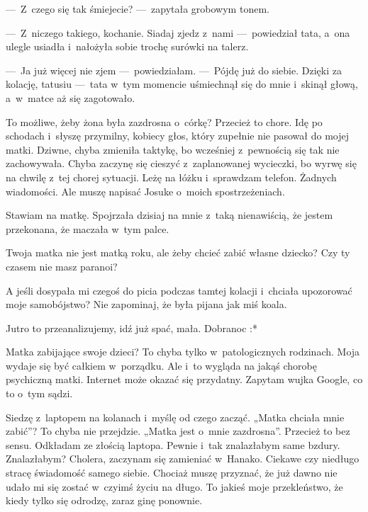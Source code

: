 ---~Z~czego się tak śmiejecie? ---~zapytała grobowym tonem.

---~Z~niczego takiego, kochanie. Siadaj zjedz z~nami ---~powiedział tata, a~ona ulegle usiadła i~nałożyła sobie 
trochę surówki na talerz.

---~Ja już więcej nie zjem ---~powiedziałam. ---~Pójdę już do siebie. Dzięki za kolację, tatusiu ---~tata w~tym 
momencie uśmiechnął się do mnie i~skinął głową, a~w~matce aż się zagotowało. 

To możliwe, żeby żona była zazdrosna o~córkę? Przecież to chore. Idę po schodach i~słyszę przymilny, kobiecy głos, 
który zupełnie nie pasował do mojej matki. Dziwne, chyba zmieniła taktykę, bo wcześniej z~pewnością się tak nie 
zachowywała. Chyba zaczynę się cieszyć z~zaplanowanej wycieczki, bo wyrwę się na chwilę z~tej chorej sytuacji. Leżę 
na łóżku i~sprawdzam telefon. Żadnych wiadomości. Ale muszę napisać Josuke o~moich spostrzeżeniach.

\begin{sms}
Stawiam na matkę. Spojrzała dzisiaj na mnie z~taką nienawiścią, że jestem przekonana, że maczała w~tym palce.
\end{sms}

\begin{sms}
Twoja matka nie jest matką roku, ale żeby chcieć zabić własne dziecko? Czy ty czasem nie masz paranoi?
\end{sms}

\begin{sms}
A jeśli dosypała mi czegoś do picia podczas tamtej kolacji i~chciała upozorować moje samobójstwo? Nie zapominaj, że 
była pijana jak miś koala.
\end{sms}

\begin{sms}
Jutro to przeanalizujemy, idź już spać, mała. Dobranoc :*
\end{sms}

Matka zabijające swoje dzieci? To chyba tylko w~patologicznych rodzinach. Moja wydaje się być całkiem w~porządku. Ale 
i~to wygląda na jakąś chorobę psychiczną matki. Internet może okazać się przydatny. Zapytam wujka Google, co to o~tym 
sądzi. 

Siedzę z~laptopem na kolanach i~myślę od czego zacząć. „Matka chciała mnie zabić”? To chyba nie przejdzie. „Matka 
jest o~mnie zazdrosna”. Przecież to bez sensu. Odkładam ze złością laptopa. Pewnie i~tak znalazłabym same bzdury. 
Znalazłabym? Cholera, zaczynam się zamieniać w~Hanako. Ciekawe czy niedługo stracę świadomość samego siebie. Chociaż 
muszę przyznać, że już dawno nie udało mi się zostać w~czyimś życiu na długo. To jakieś moje przekleństwo, że kiedy 
tylko się odrodzę, zaraz ginę ponownie. 

